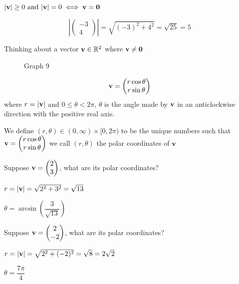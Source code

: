 \documentclass[10pt, a4paper]{article}
\begin{document}
$|\mathbf{v}| \geq 0 \text{ and } |\mathbf{v}| = 0 \iff \mathbf{v = 0}$

\begin{example}
    \[
    \left|\begin{pmatrix}
        -3 \\
        4
    \end{pmatrix}\right|
    = \sqrt{(-3) ^ 2 + 4 ^ 2} = \sqrt{25} = 5
    \]
\end{example}

Thinking about a vector $\mathbf{v} \in \mathbb{R} ^ 2$ where $\mathbf{v \neq 0}$
\begin{figure}[H]
    \centering
    \caption{Graph 9}
    \label{fig:Gr9}
\end{figure}

\[
\mathbf{v}  = \begin{pmatrix}
    r\cos\theta \\
    r\sin\theta
\end{pmatrix}
\]
where
$r = |\mathbf{v}|$ and $0 \leq \theta < 2\pi$, $\theta$ is the angle made by $\mathbf{v}$ in an anticlockwise direction with the positive real axis.

We define $(r, \theta) \in (0, \infty) \times [0, 2\pi)$
to be the unique numbers such that
$\mathbf{v}  = \begin{pmatrix}
    r\cos\theta \\
    r\sin\theta
\end{pmatrix}$
we call $(r, \theta)$ the polar coordinates of $\mathbf{v}$

\begin{example}
    Suppose $\mathbf{v} = \begin{pmatrix}
        2 \\
        3
    \end{pmatrix}$,
    what are its polar coordinates?

    $r = |\mathbf{v}| = \sqrt{2 ^ 2 + 3 ^ 2} = \sqrt{13}$

    $\theta = \arcsin \left({\dfrac{3}{\sqrt{13}}}\right)$
\end{example}

\begin{example}
    Suppose $\mathbf{v} = \begin{pmatrix}
        2 \\
        -2
    \end{pmatrix}$,
    what are its polar coordinates?

    $r = |\mathbf{v}| = \sqrt{2 ^ 2 + (-2) ^ 2} = \sqrt{8} = 2\sqrt{2}$

    $\theta = \dfrac{7\pi}{4}$
\end{example}
\end{document}
